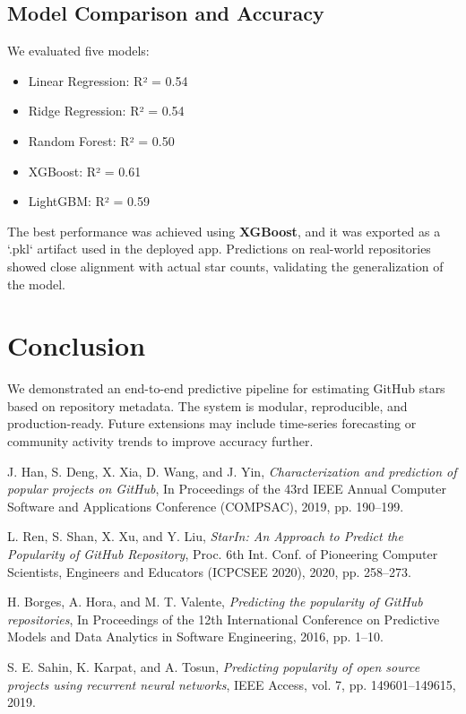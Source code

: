 \documentclass[12pt,a4paper]{article}
\begin{document}
\subsection{Model Comparison and Accuracy}
We evaluated five models:
\begin{itemize}[noitemsep]
    \item Linear Regression: R² = 0.54
    \item Ridge Regression: R² = 0.54
    \item Random Forest: R² = 0.50
    \item XGBoost: R² = 0.61
    \item LightGBM: R² = 0.59
\end{itemize}

The best performance was achieved using \textbf{XGBoost}, and it was exported as a `.pkl` artifact used in the deployed app. Predictions on real-world repositories showed close alignment with actual star counts, validating the generalization of the model.

\section{Conclusion}
We demonstrated an end-to-end predictive pipeline for estimating GitHub stars based on repository metadata. The system is modular, reproducible, and production-ready. Future extensions may include time-series forecasting or community activity trends to improve accuracy further.

\begin{thebibliography}{9}

J. Han, S. Deng, X. Xia, D. Wang, and J. Yin,  
\textit{Characterization and prediction of popular projects on GitHub},  
In Proceedings of the 43rd IEEE Annual Computer Software and Applications Conference (COMPSAC), 2019, pp. 190--199.


 L. Ren, S. Shan, X. Xu, and Y. Liu, \textit{StarIn: An Approach to Predict the Popularity of GitHub Repository}, Proc. 6th Int. Conf. of Pioneering Computer Scientists, Engineers and Educators (ICPCSEE 2020), 2020, pp. 258--273.

H. Borges, A. Hora, and M. T. Valente,
\textit{Predicting the popularity of GitHub repositories},
In Proceedings of the 12th International Conference on Predictive Models and Data Analytics in Software Engineering, 2016, pp. 1--10.

S. E. Sahin, K. Karpat, and A. Tosun,  
\textit{Predicting popularity of open source projects using recurrent neural networks},  
IEEE Access, vol. 7, pp. 149601--149615, 2019.

\end{thebibliography}
\end{document}
